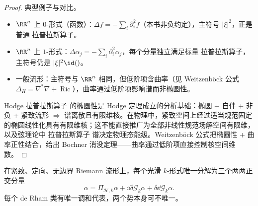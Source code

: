\begin{proof}
典型例子与对比。
\begin{itemize}
\item $\RR^n$ 上 $0$-形式（函数）：$\Delta f=-\sum_i\partial_i^2 f$（本书非负约定），主符号 $|\xi|^2$，正是普通 拉普拉斯算子。
\item $\RR^n$ 上 $1$-形式：$\Delta\alpha_j=-\sum_i\partial_i^2\alpha_j$，每个分量独立满足标量 拉普拉斯算子，主符号仍是 $|\xi|^2\id()$。
\item 一般流形：主符号与 $\RR^n$ 相同，但低阶项含曲率（见 Weitzenböck 公式 $\Delta_H=\nabla^*\nabla+\operatorname{Ric}$），曲率通过低阶项影响谱而非椭圆性。
\end{itemize}

Hodge 拉普拉斯算子 的椭圆性是 Hodge 定理成立的分析基础：椭圆 + 自伴 + 非负 + 紧致流形 $\Rightarrow$ 谱离散且有限维核。在物理中，紧致空间上经过适当规范固定的椭圆线性化具有有限维核；这不能直接推广为全部非线性规范场解空间有限维，以及弦理论中 拉普拉斯算子 谱决定物理态能级。Weitzenböck 公式把椭圆性 + 曲率正性结合，给出 Bochner 消没定理——曲率通过低阶项直接控制核空间维数。
\end{proof}

\begin{theorem}
在紧致、定向、无边界 Riemann 流形上，每个光滑 $k$-形式唯一分解为三个两两正交分量\[\alpha=\Pi_{\mathcal H,k}\alpha+\dd\delta\mathcal G_k\alpha+\delta\dd\mathcal G_k\alpha.\]每个 de Rham 类有唯一调和代表，两个势本身可不唯一。
\end{theorem}

